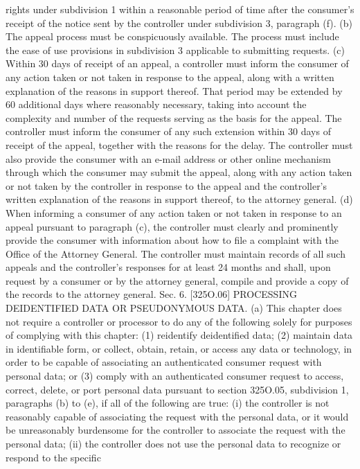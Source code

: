 rights under subdivision 1 within a reasonable period of time after the consumer's receipt
of the notice sent by the controller under subdivision 3, paragraph (f).
(b) The appeal process must be conspicuously available. The process must include the
ease of use provisions in subdivision 3 applicable to submitting requests.
(c) Within 30 days of receipt of an appeal, a controller must inform the consumer of any
action taken or not taken in response to the appeal, along with a written explanation of the
reasons in support thereof. That period may be extended by 60 additional days where
reasonably necessary, taking into account the complexity and number of the requests serving
as the basis for the appeal. The controller must inform the consumer of any such extension
within 30 days of receipt of the appeal, together with the reasons for the delay. The controller
must also provide the consumer with an e-mail address or other online mechanism through
which the consumer may submit the appeal, along with any action taken or not taken by the
controller in response to the appeal and the controller's written explanation of the reasons
in support thereof, to the attorney general.
(d) When informing a consumer of any action taken or not taken in response to an appeal
pursuant to paragraph (c), the controller must clearly and prominently provide the consumer
with information about how to file a complaint with the Office of the Attorney General.
The controller must maintain records of all such appeals and the controller's responses for
at least 24 months and shall, upon request by a consumer or by the attorney general, compile
and provide a copy of the records to the attorney general.
Sec. 6. [325O.06] PROCESSING DEIDENTIFIED DATA OR PSEUDONYMOUS
DATA.
(a) This chapter does not require a controller or processor to do any of the following
solely for purposes of complying with this chapter:
(1) reidentify deidentified data;
(2) maintain data in identifiable form, or collect, obtain, retain, or access any data or
technology, in order to be capable of associating an authenticated consumer request with
personal data; or
(3) comply with an authenticated consumer request to access, correct, delete, or port
personal data pursuant to section 325O.05, subdivision 1, paragraphs (b) to (e), if all of the
following are true:
(i) the controller is not reasonably capable of associating the request with the personal
data, or it would be unreasonably burdensome for the controller to associate the request
with the personal data;
(ii) the controller does not use the personal data to recognize or respond to the specific
